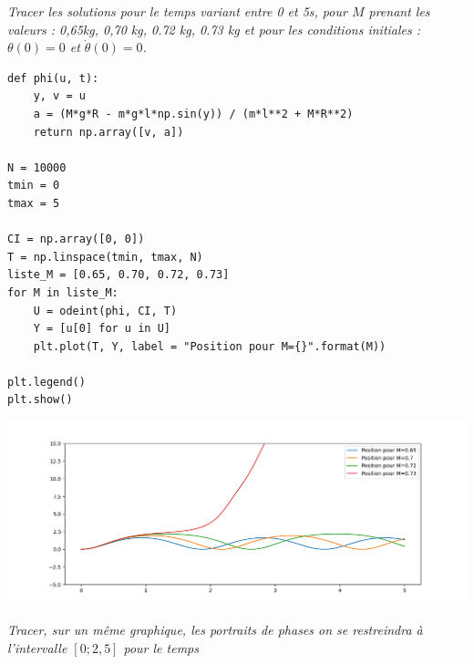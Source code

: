 \begin{Exercise}\it 
Tracer les solutions pour le temps variant entre 0 et 5s, pour $M$ prenant les valeurs :  0,65kg, 0,70 kg, 0.72 kg, 0.73 kg  et pour les conditions initiales : $\theta(0)=0$ et $\dot{\theta}(0)=0$.
\end{Exercise}
\begin{Answer}
\begin{lstlisting}
def phi(u, t):
    y, v = u
    a = (M*g*R - m*g*l*np.sin(y)) / (m*l**2 + M*R**2)
    return np.array([v, a])

N = 10000
tmin = 0
tmax = 5

CI = np.array([0, 0])
T = np.linspace(tmin, tmax, N)
liste_M = [0.65, 0.70, 0.72, 0.73]
for M in liste_M:
    U = odeint(phi, CI, T)
    Y = [u[0] for u in U]
    plt.plot(T, Y, label = "Position pour M={}".format(M))

plt.legend()
plt.show()
\end{lstlisting}
\begin{center}
\includegraphics[width=16cm]{TP/Images/ED2_asym1.png}
\end{center}
\end{Answer}
\begin{Exercise}\it 
Tracer, sur un même graphique, les portraits de phases on se restreindra à l'intervalle $[0; 2,5]$ pour le temps
\end{Exercise}
